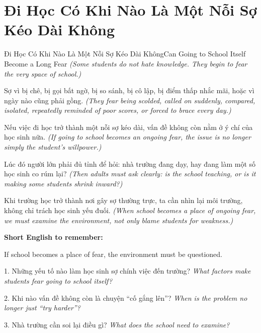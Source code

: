 \section{Đi Học Có Khi Nào Là Một Nỗi Sợ Kéo Dài Không}
\begin{truyen}{Đi Học Có Khi Nào Là Một Nỗi Sợ Kéo Dài Không}{Can Going to School Itself Become a Long Fear}
\textit{(Some students do not hate knowledge. They begin to fear the very space of school.)}

Sợ vì bị chê, bị gọi bất ngờ, bị so sánh, bị cô lập, bị điểm thấp nhắc mãi, hoặc vì ngày nào cũng phải gồng.
\textit{(They fear being scolded, called on suddenly, compared, isolated, repeatedly reminded of poor scores, or forced to brace every day.)}

Nếu việc đi học trở thành một nỗi sợ kéo dài, vấn đề không còn nằm ở ý chí của học sinh nữa.
\textit{(If going to school becomes an ongoing fear, the issue is no longer simply the student's willpower.)}

Lúc đó người lớn phải đủ tỉnh để hỏi: nhà trường đang dạy, hay đang làm một số học sinh co rúm lại?
\textit{(Then adults must ask clearly: is the school teaching, or is it making some students shrink inward?) }
\end{truyen}

\begin{baihoc}
Khi trường học trở thành nơi gây sợ thường trực, ta cần nhìn lại môi trường, không chỉ trách học sinh yếu đuối.
\textit{(When school becomes a place of ongoing fear, we must examine the environment, not only blame students for weakness.)}
\end{baihoc}

\begin{ghinhoanh}
\textbf{Short English to remember:}

If school becomes a place of fear, the environment must be questioned.

\end{ghinhoanh}

\begin{tuhocnhanh}
1. Những yếu tố nào làm học sinh sợ chính việc đến trường? \textit{What factors make students fear going to school itself?}

2. Khi nào vấn đề không còn là chuyện “cố gắng lên”? \textit{When is the problem no longer just “try harder”?}

3. Nhà trường cần soi lại điều gì? \textit{What does the school need to examine?}
\end{tuhocnhanh}
\ngancach

